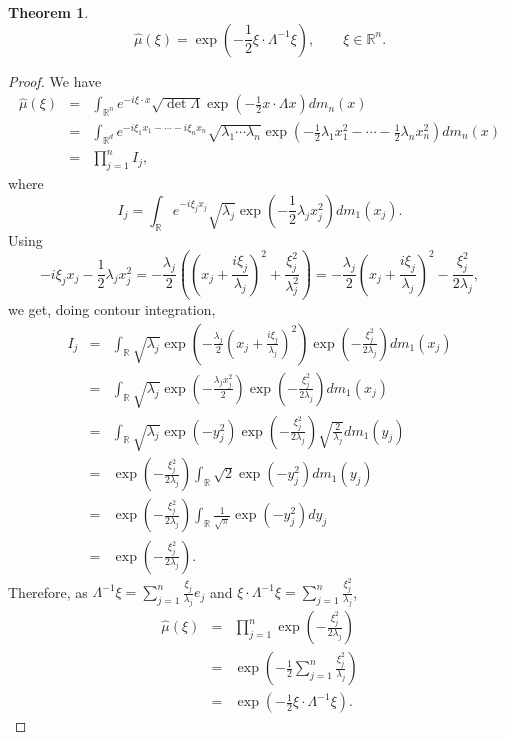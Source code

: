 \documentclass{article}
\newtheorem{theorem}{Theorem}
\theoremstyle{definition}
\begin{document}
\begin{theorem}
\[
\hat{\mu}(\xi)=\exp\left(-\frac{1}{2} \xi \cdot \Lambda^{-1}\xi\right), \qquad \xi \in \mathbb{R}^n.
\]
\end{theorem}
\begin{proof}
We have
\begin{eqnarray*}
\hat{\mu}(\xi)&=&\int_{\mathbb{R}^n} e^{-i\xi \cdot x} \sqrt{\det \Lambda} \exp\left(-\frac{1}{2} x\cdot \Lambda x\right) dm_n(x)\\
&=&\int_{\mathbb{R}^d} e^{-i\xi_1 x_1-\cdots-i\xi_n x_n} \sqrt{\lambda_1 \cdots \lambda_n} \exp\left(-\frac{1}{2}\lambda_1 x_1^2 - \cdots - \frac{1}{2}\lambda_n
x_n^2 \right) dm_n(x)\\
&=&\prod_{j=1}^n I_j,
\end{eqnarray*}
where
\[
I_j=\int_\mathbb{R} e^{-i\xi_j x_j} \sqrt{\lambda_j} \exp\left(-\frac{1}{2}\lambda_j x_j^2\right) dm_1(x_j).
\]
Using
\[
-i\xi_j x_j-\frac{1}{2}\lambda_jx_j^2 = -\frac{\lambda_j}{2} \left( \left(x_j+\frac{i\xi_j}{\lambda_j}\right)^2 + \frac{\xi_j^2}{\lambda_j^2} \right)
=-\frac{\lambda_j}{2}  \left(x_j+\frac{i\xi_j}{\lambda_j}\right)^2 - \frac{\xi_j^2}{2\lambda_j},
\]
we get, doing contour integration,
\begin{eqnarray*}
I_j&=&\int_\mathbb{R} \sqrt{\lambda_j} \exp\left(-\frac{\lambda_j}{2} \left(x_j+\frac{i\xi_j}{\lambda_j}\right)^2 \right)
\exp \left( -\frac{\xi_j^2}{2\lambda_j} \right) dm_1(x_j)\\
&=&\int_\mathbb{R} \sqrt{\lambda_j} \exp\left(-\frac{\lambda_j x_j^2}{2} \right)\exp \left( -\frac{\xi_j^2}{2\lambda_j} \right) dm_1(x_j)\\
&=&\int_\mathbb{R} \sqrt{\lambda_j} \exp(-y_j^2) \exp \left( -\frac{\xi_j^2}{2\lambda_j} \right) \sqrt{\frac{2}{\lambda_j}} dm_1(y_j)\\
&=& \exp \left( -\frac{\xi_j^2}{2\lambda_j} \right) \int_\mathbb{R}  \sqrt{2} \exp(-y_j^2) dm_1(y_j)\\
&=& \exp \left( -\frac{\xi_j^2}{2\lambda_j} \right)  \int_{\mathbb{R}} \frac{1}{\sqrt{\pi}} \exp(-y_j^2) dy_j\\
&=& \exp \left( -\frac{\xi_j^2}{2\lambda_j} \right).
\end{eqnarray*}
Therefore, as $\Lambda^{-1}\xi =\sum_{j=1}^n \frac{\xi_j}{\lambda_j}e_j$ and $\xi \cdot \Lambda^{-1}\xi = \sum_{j=1}^n \frac{\xi_j^2}{\lambda_j}$,
\begin{eqnarray*}
\hat{\mu}(\xi)&=&\prod_{j=1}^n  \exp \left( -\frac{\xi_j^2}{2\lambda_j} \right)\\
&=&\exp\left(-\frac{1}{2} \sum_{j=1}^n \frac{\xi_j^2}{\lambda_j}\right)\\
&=&\exp\left(-\frac{1}{2} \xi \cdot \Lambda^{-1}\xi\right).
\end{eqnarray*}
\end{proof}
\end{document}
